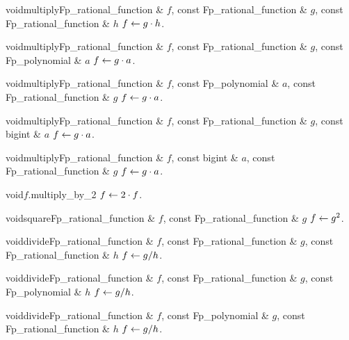 \begin{fcode}{void}{multiply}{Fp_rational_function & $f$, const Fp_rational_function & $g$,
    const Fp_rational_function & $h$}%
  $f \leftarrow g \cdot h$.
\end{fcode}

\begin{fcode}{void}{multiply}{Fp_rational_function & $f$, const Fp_rational_function & $g$,
    const Fp_polynomial & $a$}%
  $f \leftarrow g \cdot a$.
\end{fcode}

\begin{fcode}{void}{multiply}{Fp_rational_function & $f$, const Fp_polynomial & $a$,
    const Fp_rational_function & $g$}%
  $f \leftarrow g \cdot a$.
\end{fcode}

\begin{fcode}{void}{multiply}{Fp_rational_function & $f$, const Fp_rational_function & $g$,
    const bigint & $a$}%
  $f \leftarrow g \cdot a$.
\end{fcode}

\begin{fcode}{void}{multiply}{Fp_rational_function & $f$, const bigint & $a$,
    const Fp_rational_function & $g$}%
  $f \leftarrow g \cdot a$.
\end{fcode}

\begin{fcode}{void}{$f$.multiply_by_2}{}
  $f \leftarrow 2 \cdot f$.
\end{fcode}

\begin{fcode}{void}{square}{Fp_rational_function & $f$, const Fp_rational_function & $g$}
  $f \leftarrow g^2$.
\end{fcode}

\begin{fcode}{void}{divide}{Fp_rational_function & $f$, const Fp_rational_function & $g$,
    const Fp_rational_function & $h$}%
  $f \leftarrow g / h$.
\end{fcode}

\begin{fcode}{void}{divide}{Fp_rational_function & $f$, const Fp_rational_function & $g$,
    const Fp_polynomial & $h$}%
  $f \leftarrow g / h$.
\end{fcode}

\begin{fcode}{void}{divide}{Fp_rational_function & $f$, const Fp_polynomial & $g$,
    const Fp_rational_function & $h$}%
  $f \leftarrow g / h$.
\end{fcode}

